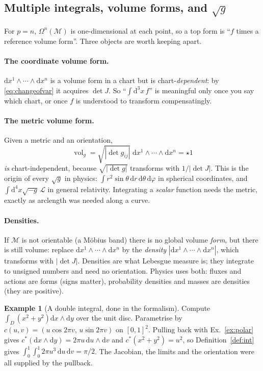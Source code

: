 \documentclass[10pt,a4paper]{article}
\newcommand{\dd}{\mathrm{d}}
\newcommand{\M}{\mathcal{M}}
\newcommand{\Om}{\Omega}
\DeclareMathOperator{\vol}{vol}
\theoremstyle{plain}
\theoremstyle{definition}
\newtheorem{ex}[thm]{Example}
\numberwithin{equation}{section}
\begin{document}
\subsection{Multiple integrals, volume forms, and $\sqrt{g}$}
\label{sec:volume}

For $p=n$, $\Om^n(\M)$ is one-dimensional at each point, so a top form is ``$f$ times a
reference volume form''. Three objects are worth keeping apart.

\paragraph{The coordinate volume form.} $\dd x^1\wedge\cdots\wedge\dd x^n$ is a volume form in a
chart but is chart-\emph{dependent}: by \eqref{eq:changeofvar} it acquires $\det J$. So
``$\int\dd^3x\,f$'' is meaningful only once you say which chart, or once $f$ is understood to
transform compensatingly.

\paragraph{The metric volume form.} Given a metric and an orientation,
\begin{equation}
\vol_g=\sqrt{|\det g_{ij}|}\;\dd x^1\wedge\cdots\wedge\dd x^n=\star1
\end{equation}
\emph{is} chart-independent, because $\sqrt{|\det g|}$ transforms with $1/|\det J|$. This is the
origin of every $\sqrt g$ in physics: $\int r^2\sin\theta\,\dd r\,\dd\theta\,\dd\varphi$ in
spherical coordinates, and $\int\dd^4x\sqrt{-g}\,\mathcal L$ in general relativity. Integrating
a \emph{scalar} function needs the metric, exactly as arclength was needed along a curve.

\paragraph{Densities.} If $\M$ is not orientable (a M\"obius band) there is no global volume
\emph{form}, but there is still volume: replace $\dd x^1\wedge\cdots\wedge\dd x^n$ by the
\emph{density} $|\dd x^1\wedge\cdots\wedge\dd x^n|$, which transforms with $|\det J|$.
Densities are what Lebesgue measure is; they integrate to unsigned numbers and need no
orientation. Physics uses both: fluxes and actions are forms (signs matter), probability
densities and masses are densities (they are positive).

\begin{ex}[A double integral, done in the formalism]
Compute $\int_D(x^2+y^2)\dd x\wedge\dd y$ over the unit disc. Parametrise by
$c(u,v)=(u\cos2\pi v,\,u\sin2\pi v)$ on $[0,1]^2$. Pulling back with Ex.~\ref{ex:polar} gives
$c^*(\dd x\wedge\dd y)=2\pi u\,\dd u\wedge\dd v$ and $c^*(x^2+y^2)=u^2$, so
Definition~\ref{def:int} gives $\int_0^1\!\!\int_0^1 2\pi u^3\,\dd u\,\dd v=\pi/2$. The
Jacobian, the limits and the orientation were all supplied by the pullback.
\end{ex}
\end{document}
